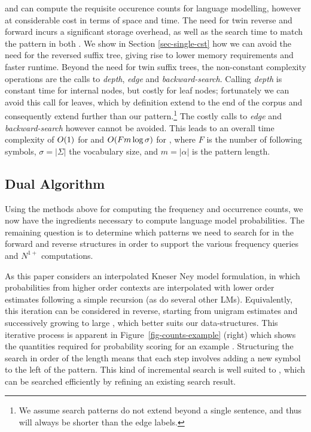 \nlplusname and \nlplusfrontbackname can compute the requisite occurence counts for \ngram language modelling, however at considerable cost in terms of space and time. 
The need for twin reverse and forward \CSTs incurs a significant storage overhead, as well as the search time to match the pattern in both \CSTs. 
We show in Section \ref{sec-single-cst}  how we can avoid the need for the reversed suffix  tree, giving rise to lower memory requirements and faster runtime. 
Beyond the need for twin suffix trees, the non-constant complexity operations are the calls to \emph{depth}, \emph{edge} and \emph{backward-search}.
Calling \emph{depth} is constant time for internal nodes, but costly for leaf nodes; fortunately we can avoid this call for leaves, which by definition extend to the end of the corpus and consequently extend further than our pattern.\footnote{We assume search patterns do not extend beyond a single sentence, and thus will always be shorter than the edge labels.}
The costly calls to \emph{edge} and \emph{backward-search} however cannot be avoided.
This leads to an overall time complexity of $O(1)$ for \nlplusname and $O(F m \log\sigma)$ for \nlplusfrontbackname, where $F$ is the number of following symbols, $\sigma=|\Sigma|$ the vocabulary size, and $m=|\alpha|$ is the pattern length.

\subsection{Dual \CST Algorithm} 

Using the methods above for computing the frequency and occurrence
counts, we now have the ingredients necessary to compute \ngram language model
probabilities. The remaining question is to determine which patterns we need to search for
in the forward and reverse \CST structures in order to support the
various frequency queries and $N^{1+}$ computations.

As this paper considers an interpolated Kneser Ney model formulation, in which
probabilities from higher order contexts are interpolated with lower
order estimates following a simple recursion (as do several other LMs). 
Equivalently, this iteration can be considered in reverse, starting from unigram
estimates and successively growing to large \ngrams, which better
suits our \CST data-structures.
This iterative process is apparent in Figure~\ref{fig-counts-example} (right) which
shows the quantities required for probability scoring for an example \ngram.
Structuring the search in order of the \ngram length means that each step involves adding a new symbol to the left of the pattern.
This kind of incremental search is well suited to \CSTs, which can be searched efficiently by refining an existing search result.


